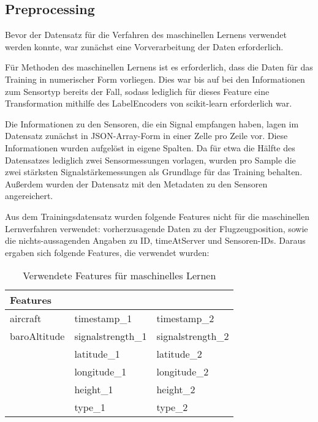 \documentclass{svproc}
\begin{document}
\subsection{Preprocessing}
Bevor der Datensatz für die Verfahren des maschinellen Lernens verwendet werden konnte, war zunächst eine Vorverarbeitung der Daten erforderlich.

Für Methoden des maschinellen Lernens ist es erforderlich, dass die Daten für das Training in numerischer Form vorliegen. Dies war bis auf bei den Informationen zum Sensortyp bereits der Fall, sodass lediglich für dieses Feature eine Transformation mithilfe des LabelEncoders von scikit-learn erforderlich war.

Die Informationen zu den Sensoren, die ein Signal empfangen haben, lagen im Datensatz zunächst in JSON-Array-Form in einer Zelle pro Zeile vor. Diese Informationen wurden aufgelöst in eigene Spalten. Da für etwa die Hälfte des Datensatzes lediglich zwei Sensormessungen vorlagen, wurden pro Sample die zwei stärksten Signalstärkemessungen als Grundlage für das Training behalten. Außerdem wurden der Datensatz mit den Metadaten zu den Sensoren angereichert.

Aus dem Trainingsdatensatz wurden folgende Features nicht für die maschinellen Lernverfahren verwendet:  vorherzusagende Daten zu der Flugzeugposition, sowie die nichts-aussagenden Angaben zu ID,  timeAtServer und Sensoren-IDs. Daraus ergaben sich folgende Features, die verwendet wurden:

\begin{table}[]
\centering
\caption{Verwendete Features für maschinelles Lernen}
\begin{tabular}{@{}lll@{}}
\toprule
\textbf{Features} &                   & \textbf{}         \\ \midrule
aircraft          & timestamp\_1      & timestamp\_2      \\
baroAltitude      & signalstrength\_1 & signalstrength\_2 \\
                  & latitude\_1       & latitude\_2       \\
                  & longitude\_1      & longitude\_2      \\
                  & height\_1         & height\_2         \\
                  & type\_1           & type\_2           \\ \bottomrule
\end{tabular}
\end{table}
\end{document}
